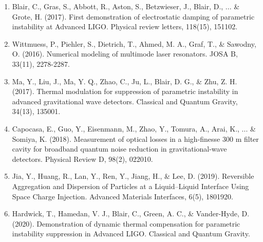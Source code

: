 \begin{enumerate}
\item Blair, C., Gras, S., Abbott, R., Aston, S., Betzwieser, J., Blair, D., ... \& Grote, H. (2017). First demonstration of electrostatic damping of parametric instability at Advanced LIGO. Physical review letters, 118(15), 151102.

\item Wittmuess, P., Piehler, S., Dietrich, T., Ahmed, M. A., Graf, T., \& Sawodny, O. (2016). Numerical modeling of multimode laser resonators. JOSA B, 33(11), 2278-2287.

\item Ma, Y., Liu, J., Ma, Y. Q., Zhao, C., Ju, L., Blair, D. G., \& Zhu, Z. H. (2017). Thermal modulation for suppression of parametric instability in advanced gravitational wave detectors. Classical and Quantum Gravity, 34(13), 135001.

\item Capocasa, E., Guo, Y., Eisenmann, M., Zhao, Y., Tomura, A., Arai, K., ... \& Somiya, K. (2018). Measurement of optical losses in a high-finesse 300 m filter cavity for broadband quantum noise reduction in gravitational-wave detectors. Physical Review D, 98(2), 022010.

\item Jia, Y., Huang, R., Lan, Y., Ren, Y., Jiang, H., & Lee, D. (2019). Reversible Aggregation and Dispersion of Particles at a Liquid–Liquid Interface Using Space Charge Injection. Advanced Materials Interfaces, 6(5), 1801920.

\item Hardwick, T., Hamedan, V. J., Blair, C., Green, A. C., & Vander-Hyde, D. (2020). Demonstration of dynamic thermal compensation for parametric instability suppression in Advanced LIGO.  Classical and Quantum Gravity.

\end{enumerate}

